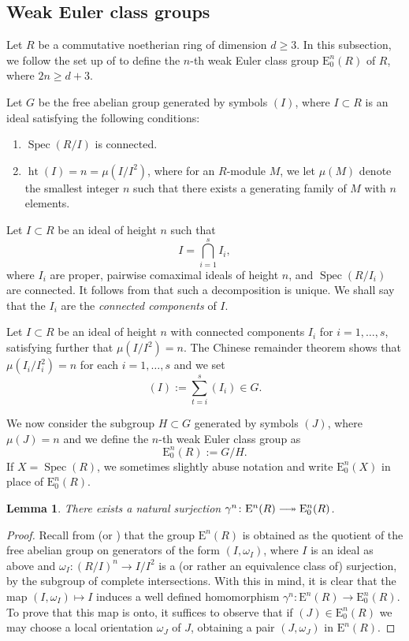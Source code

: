 \documentclass[11pt,leqno]{amsart}
\newcommand{\Spec}{\operatorname{Spec}}
\newcommand{\longtwoheadrightarrow}{\relbar\joinrel\twoheadrightarrow}
\renewcommand{\1}{{\rm 1\hspace*{-0.4ex}%
\rule{0.1ex}{1.52ex}\hspace*{0.2ex}}}
\newcommand{\<}[1]{{\langle}#1 {\rangle}}
\newcommand{\Er}{\mathrm{E}}
\theoremstyle{plain}
\newtheorem{lem}[thm]{Lemma}
\theoremstyle{definition}
\theoremstyle{remark}
\numberwithin{equation}{section}
\begin{document}
\subsection*{Weak Euler class groups}

 Let $R$ be a commutative noetherian ring of dimension $d\ge 3$. In this subsection, we follow the set up of \cite{bhatwadekarEulerClassGroup2000} to define the $n$-th weak Euler class group ${\Er^n_0}(R)$ of $R$, where $2n \ge d + 3$.
 
Let $G$ be the free abelian group generated by symbols $(I)$, where $I \subset R$ is an ideal satisfying the following conditions:
\begin{enumerate}
\item $\Spec(R/I)$ is connected.
\item $\operatorname{ht}({I})=n=\mu(I/I^2)$, where for an $R$-module $M$, we let $\mu(M)$ denote the smallest integer $n$ such that there exists a generating family of $M$ with $n$ elements.
\end{enumerate}

Let $I \subset R$ be an ideal of height $n$ such that 
\[
I = \bigcap_{i=1}^{s} {I}_i,
\]where ${I}_i$ are proper, pairwise comaximal ideals of height $n$, and $\Spec(R/I_i)$ are connected. It follows from \cite[Lemma 4.1]{bhatwadekarEulerClassGroup2000} that such a decomposition is unique. We shall say that the ${I}_i$ are the \emph{connected components} of $I$.

Let $I \subset R$ be an ideal of height $n$ with connected components ${I}_i$ for $i=1,\dots, s$, satisfying further that $\mu(I/I^2) = n$. 
The Chinese remainder theorem shows that $\mu({I}_i/{I}_i^2) = n$ for each $i = 1, \dots, s$ and we set
\[
(I) := \sum_{t=i}^s ({I}_i) \in G.
\]

We now consider the subgroup $H\subset G$ generated by symbols $(J)$, where $\mu(J)=n$ and we define the $n$-th weak Euler class group as 
\[
\mathrm{E}^n_0(R):=G/H.
\]
If $X=\Spec(R)$, we sometimes slightly abuse notation and write $\mathrm{E}^n_0(X)$ in place of $\mathrm{E}^n_0(R)$.

\begin{lem}\label{lem:ontoECGtowECG}
There exists a natural surjection $\gamma^n\colon \mathrm{E}^{n}(R) \longtwoheadrightarrow \mathrm{E}^{n}_0(R)$. 
\end{lem}

\begin{proof} 
Recall from \cite[p. 147]{bhatwadekarEulerClassesStably2002} (or \cite[Definition 3.1.5]{asokEulerClassGroups2021}) that the group $\mathrm{E}^{n}(R)$ is obtained as the quotient of the free abelian group on generators of the form $(I,\omega_I)$, where $I$ is an ideal as above and $\omega_I\colon (R/I)^n\to I/I^2$ is a (or rather an equivalence class of) surjection, by the subgroup of complete intersections. With this in mind, it is clear that the map $(I,\omega_I)\mapsto I$ induces a well defined homomorphism $\gamma^n\colon \mathrm{E}^{n}(R) \to \mathrm{E}^{n}_0(R)$. To prove that this map is onto, it suffices to observe that if $(J)\in \mathrm{E}^n_0(R)$ we may choose a local orientation $\omega_J$ of $J$, obtaining a pair $(J,\omega_J)$ in $\mathrm{E}^{n}(R)$. 
\end{proof}
\end{document}
